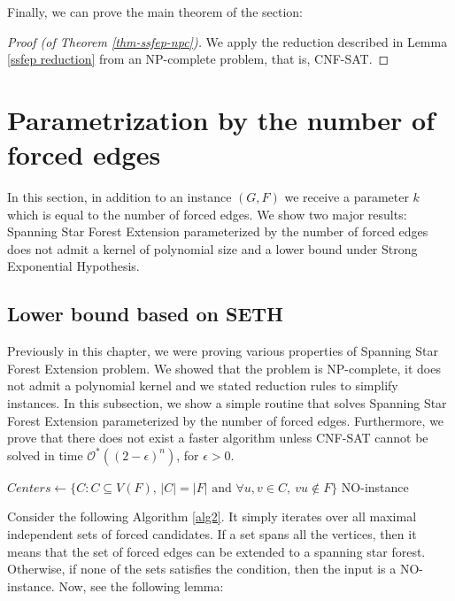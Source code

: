 \documentclass[en]{pracamgr}
\theoremstyle{definition}
\newcommand{\ssf}{spanning star forest}
\newcommand{\ssfep}{{\sc Spanning Star Forest Extension}}
\newcommand{\cnfsat}{{\sc CNF-SAT}}
\begin{document}
Finally, we can prove the main theorem of the section:

\begin{proof}[Proof (of Theorem \ref{thm-ssfep-npc})]
	We apply the reduction described in Lemma \ref{ssfep reduction} from an NP-complete problem, that is, \cnfsat{}.
\end{proof}

\section{Parametrization by the number of forced edges}

In this section, in addition to an instance $(G,F)$ we receive a parameter $k$ which is equal to the number of forced edges. We show two major results: \ssfep{} parameterized by the number of forced edges does not admit a kernel of polynomial size and a lower bound under Strong Exponential Hypothesis.

\subsection{Lower bound based on SETH}

Previously in this chapter, we were proving various properties of \ssfep{} problem. We showed that the problem is NP-complete, it does not admit a polynomial kernel and we stated reduction rules to simplify instances. In this subsection, we show a simple routine that solves \ssfep{} parameterized by the number of forced edges. Furthermore, we prove that there does not exist a faster algorithm unless \cnfsat{} cannot be solved in time $\mathcal{O}^*((2-\epsilon)^n)$, for $\epsilon>0$.

\begin{algorithm}\label{alg2}
	\KwResult{\ssf{} of $G$ extending $F$}
	$Centers \leftarrow \{C: C \subseteq V(F) \text{, }|C|=|F| \text{ and } \forall u,v \in C,\ vu \notin F\}$\;
	\Return NO-instance\;
	\caption{Extending a spanning star forest from a normalized graph.}
\end{algorithm}

Consider the following Algorithm \ref{alg2}. It simply iterates over all maximal independent sets of forced candidates. If a set spans all the vertices, then it means that the set of forced edges can be extended to a spanning star forest. Otherwise, if none of the sets satisfies the condition, then the input is a NO-instance. Now, see the following lemma:
\end{document}
